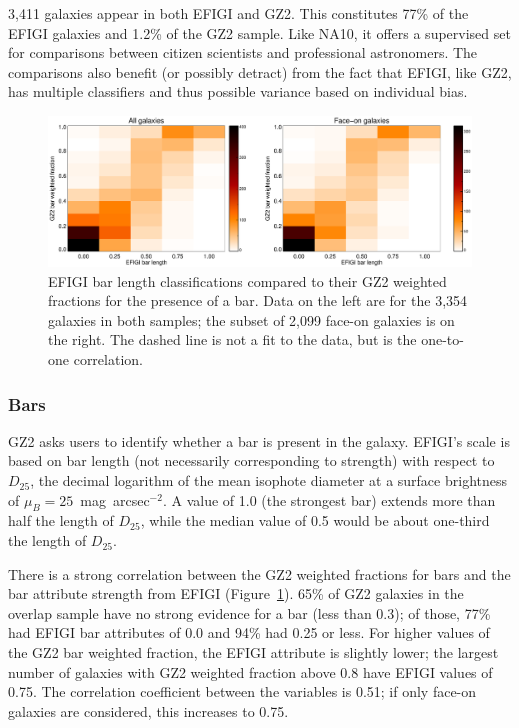 \documentclass[useAMS,usenatbib]{mn2e}
\begin{document}
3,411 galaxies appear in both EFIGI and GZ2. This constitutes 77\% of the EFIGI galaxies and 1.2\% of the GZ2 sample. Like NA10, it offers a supervised set for comparisons between citizen scientists and professional astronomers. The comparisons also benefit (or possibly detract) from the fact that EFIGI, like GZ2, has multiple classifiers and thus possible variance based on individual bias. 

\begin{figure}
\includegraphics[angle=0,width=7.0in]{figures/efigi_bars.eps}
\caption{EFIGI bar length classifications compared to their GZ2 weighted fractions for the presence of a bar. Data on the left are for the 3,354 galaxies in both samples; the subset of 2,099 face-on galaxies is on the right. The dashed line is not a fit to the data, but is the one-to-one correlation. 
\label{fig-efigi_bars}}
\end{figure}

\subsubsection{Bars}

GZ2 asks users to identify whether a bar is present in the galaxy. EFIGI's scale is based on bar length (not necessarily corresponding to strength) with respect to $D_{25}$, the decimal logarithm of the mean isophote diameter at a surface brightness of $\mu_B=25$~mag~arcsec$^{-2}$. A value of 1.0 (the strongest bar) extends more than half the length of $D_{25}$, while the median value of 0.5 would be about one-third the length of $D_{25}$. 

There is a strong correlation between the GZ2 weighted fractions for bars and the bar attribute strength from EFIGI (Figure~\ref{fig-efigi_bars}). 65\% of GZ2 galaxies in the overlap sample have no strong evidence for a bar (less than 0.3); of those, 77\% had EFIGI bar attributes of 0.0 and 94\% had 0.25 or less. For higher values of the GZ2 bar weighted fraction, the EFIGI attribute is slightly lower; the largest number of galaxies with GZ2 weighted fraction above 0.8 have EFIGI values of 0.75. The correlation coefficient between the variables is 0.51; if only face-on galaxies are considered, this increases to 0.75. 
\end{document}

